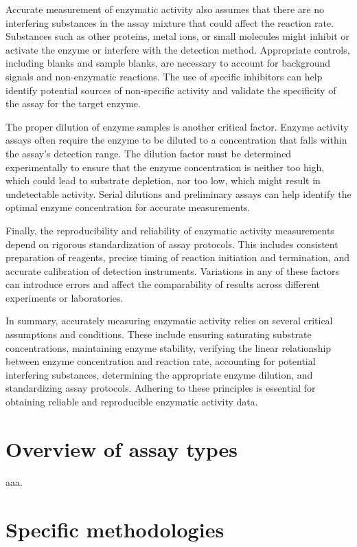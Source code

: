 \documentclass[
  9pt,
  american,
  a5paper,
  extrafontsizes,onecolumn,openright
  ]{memoir}
\newlength{\rf}
\begin{document}
Accurate measurement of enzymatic activity also assumes that there are no interfering substances in the assay mixture that could affect the reaction rate. Substances such as other proteins, metal ions, or small molecules might inhibit or activate the enzyme or interfere with the detection method. Appropriate controls, including blanks and sample blanks, are necessary to account for background signals and non-enzymatic reactions. The use of specific inhibitors can help identify potential sources of non-specific activity and validate the specificity of the assay for the target enzyme.

The proper dilution of enzyme samples is another critical factor. Enzyme activity assays often require the enzyme to be diluted to a concentration that falls within the assay's detection range. The dilution factor must be determined experimentally to ensure that the enzyme concentration is neither too high, which could lead to substrate depletion, nor too low, which might result in undetectable activity. Serial dilutions and preliminary assays can help identify the optimal enzyme concentration for accurate measurements.

Finally, the reproducibility and reliability of enzymatic activity measurements depend on rigorous standardization of assay protocols. This includes consistent preparation of reagents, precise timing of reaction initiation and termination, and accurate calibration of detection instruments. Variations in any of these factors can introduce errors and affect the comparability of results across different experiments or laboratories.

In summary, accurately measuring enzymatic activity relies on several critical assumptions and conditions. These include ensuring saturating substrate concentrations, maintaining enzyme stability, verifying the linear relationship between enzyme concentration and reaction rate, accounting for potential interfering substances, determining the appropriate enzyme dilution, and standardizing assay protocols. Adhering to these principles is essential for obtaining reliable and reproducible enzymatic activity data.

\section{Overview of assay types}\label{overview-of-assay-types}

aaa.

\section{Specific methodologies}\label{specific-methodologies}
\end{document}
